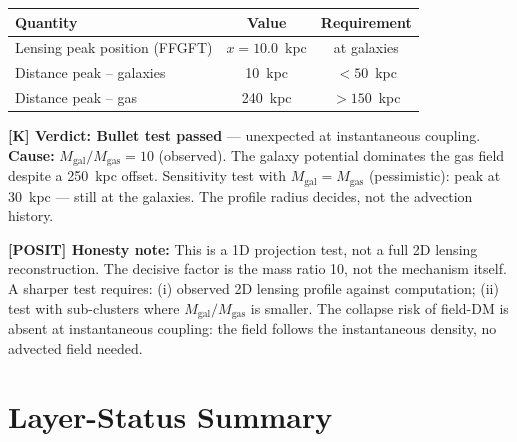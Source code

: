 \begin{center}
\begin{tabular}{lcc}
\toprule
Quantity & Value & Requirement \\
\midrule
Lensing peak position (FFGFT) & $x = 10.0$~kpc & at galaxies \\
Distance peak -- galaxies & 10~kpc & $< 50$~kpc \\
Distance peak -- gas & 240~kpc & $> 150$~kpc \\
\bottomrule
\end{tabular}
\end{center}

\textbf{[K] Verdict: Bullet test passed} — unexpected at instantaneous
coupling. \textbf{Cause:} $M_\text{gal}/M_\text{gas} = 10$ (observed).
The galaxy potential dominates the gas field despite a 250~kpc offset.
Sensitivity test with $M_\text{gal} = M_\text{gas}$ (pessimistic):
peak at 30~kpc — still at the galaxies. The profile radius decides,
not the advection history.

\medskip
\textbf{[POSIT] Honesty note:} This is a 1D projection test, not a
full 2D lensing reconstruction. The decisive factor is the mass ratio 10,
not the mechanism itself. A sharper test requires: (i) observed 2D lensing
profile against computation; (ii) test with sub-clusters where
$M_\text{gal}/M_\text{gas}$ is smaller. The collapse risk of field-DM
is absent at instantaneous coupling: the field follows the instantaneous
density, no advected field needed.

\chapter{Layer-Status Summary}

